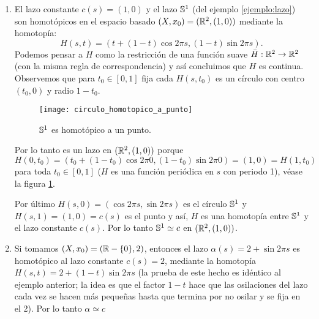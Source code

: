 \documentclass[../../topologia_algebraica]{subfiles}
\begin{document}
\begin{ejemplo}\label{ejemplo:homotopia_lazos}$\;$\\
  \begin{enumerate}
  \item El lazo constante $c(s)=(1,0)$ y el lazo $\mathbb{S}^1$ (del ejemplo \ref{ejemplo:lazo}) son
    homot\'opicos en el espacio basado $(X,x_0)=(\mathbb{R}^2,(1,0))$ mediante la homotop\'ia:
    \[
      H(s,t)=(t+(1-t)\cos 2\pi s,(1-t)\sin 2\pi s).
    \]
    Podemos pensar a $H$ como la restricci\'on de una funci\'on suave $\bar{H}:\mathbb{R}^2\rightarrow\mathbb{R}^2$
    (con la misma regla de correspondencia) y as\'i concluimos que $H$ es continua. Observemos
    que para $t_0\in[0,1]$ fija cada $H(s,t_0)$ es un c\'irculo con centro $(t_0,0)$ y radio
    $1-t_0$.
\begin{figure}
  \caption{$\mathbb{S}^1$ es homot\'opico a un punto.}
  \texttt{[image: circulo\_homotopico\_a\_punto]}\centering
  \label{fig:circulo_homotopico_a_punto}
\end{figure}
    Por lo tanto es un lazo en $(\mathbb{R}^2,(1,0))$ porque
    \[
      H(0,t_0)=(t_0+(1-t_0)\cos 2\pi 0,(1-t_0)\sin2\pi 0)=(1,0)=H(1,t_0)
    \]
    para toda $t_0\in[0,1]$ ($H$ es una funci\'on peri\'odica en $s$ con periodo 1), v\'ease
    la figura \ref{fig:circulo_homotopico_a_punto}.

    Por \'ultimo $H(s,0)=(\cos2\pi s,\sin 2\pi s)$ es el c\'irculo $\mathbb{S}^1$ y $H(s,1)=(1,0)=c(s)$ es
    el punto y as\'i, $H$ es una homotop\'ia entre $\mathbb{S}^1$ y el lazo constante $c(s)$. Por lo tanto
    $\mathbb{S}^1\simeq c$ en $(\mathbb{R}^2,(1,0))$.

  \item Si tomamos $(X,x_0)=(\mathbb{R}-\{0\},2)$, entonces el lazo $\alpha(s)=2+\sin2\pi s$ es homot\'opico al
    lazo constante $c(s)=2$, mediante la homotop\'ia $H(s,t)=2+(1-t)\sin 2\pi s$ (la prueba de este
    hecho es id\'entico al ejemplo anterior; la idea es que el factor $1-t$ hace que las osilaciones
    del lazo cada vez se hacen m\'as peque\~nas hasta que termina por no osilar y se fija en el 2).
    Por lo tanto $\alpha\simeq c$
    

\end{enumerate}
\end{ejemplo}
\end{document}

